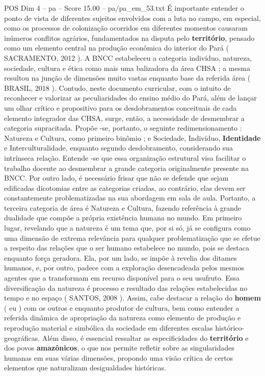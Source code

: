 \begin{textsample}{POS Dim 4 – pa – Score 15.00 – pa/pa\_em\_53.txt}
É importante entender o ponto de vista de diferentes sujeitos envolvidos com a luta no campo, em especial, como os processos de colonização ocorridos em diferentes momentos causaram inúmeros conflitos agrários, fundamentados na disputa pelo \textbf{território}, pensado como um elemento central na produção econômica do interior do Pará ( SACRAMENTO, 2012 ).
A BNCC estabeleceu a categoria indivíduo, natureza, sociedade, cultura e ética como mais uma balizadora da área CHSA ; a mesma resultou na junção de dimensões muito vastas enquanto base da referida área ( BRASIL, 2018 ).
Contudo, neste documento curricular, com o intuito de reconhecer e valorizar as peculiaridades do ensino médio do Pará, além de lançar um olhar crítico e propositivo para os desdobramentos conceituais de cada elemento integrador das CHSA, surge, então, a necessidade de desmembrar a categoria supracitada.
Propõe -se, portanto, o seguinte redimensionamento : Natureza e Cultura, como primeiro binômio ; e Sociedade, Indivíduo, \textbf{Identidade} e Interculturalidade, enquanto segundo desdobramento, considerando sua intrínseca relação.
Entende -se que essa organização estrutural visa facilitar o trabalho docente ao desmembrar a grande categoria originalmente presente na BNCC.
Por outro lado, é necessário frisar que não se defende que sejam edificadas dicotomias entre as categorias criadas, ao contrário, elas devem ser constantemente problematizadas na sua abordagem em sala de aula.
Portanto, a terceira categoria de área é Natureza e Cultura, fazendo referência à grande dualidade que compõe a própria existência humana no mundo.
Em primeiro lugar, revelando que a natureza é um tema que, por si só, já se configura como uma dimensão de extrema relevância para qualquer problematização que se efetue a respeito das relações que o ser humano estabelece no mundo, pois se destaca enquanto força geradora.
Ela, por um lado, se impõe à revelia dos ditames humanos, e, por outro, padece com a exploração desencadeada pelos mesmos agentes que a transformam em recurso disponível para o seu usufruto.
Essa diversificação da natureza é processo e resultado das relações estabelecidas no tempo e no espaço ( SANTOS, 2008 ).
Assim, cabe destacar a relação do \textbf{homem} ( eu ) com os outros e enquanto produtor de cultura, bem como entender a referida dinâmica de apropriação da natureza como elemento de produção e reprodução material e simbólica da sociedade em diferentes escalas histórico-geográficas.
Além disso, é essencial ressaltar as especificidades do \textbf{território} e dos povos \textbf{amazônicos}, o que nos permite refletir sobre as singularidades humanas em suas várias dimensões, propondo uma visão crítica de certos elementos que naturalizam desigualdades históricas.

\end{textsample}

